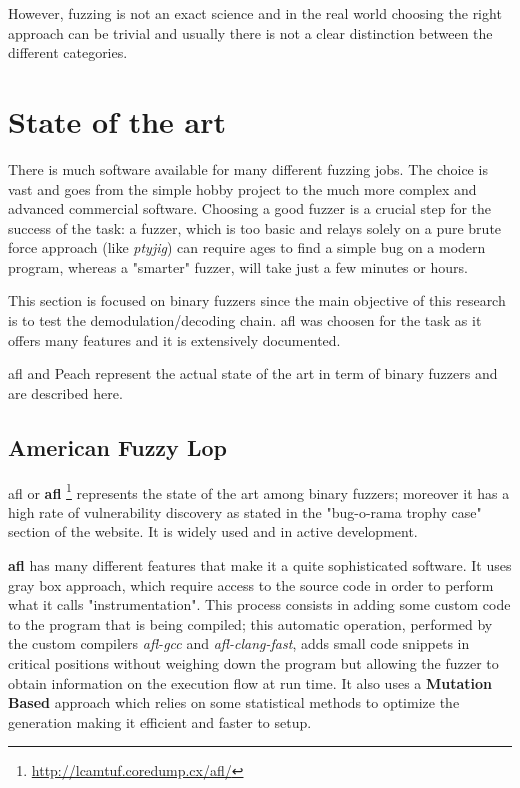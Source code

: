\documentclass[../main.tex]{subfiles}
\begin{document}
However, fuzzing is not an exact science and in the real world choosing the right approach can be trivial and usually there is not a clear distinction between the different categories.


\section{State of the art}

There is much software available for many different fuzzing jobs. The choice is vast and goes from the simple hobby project to the much more complex and advanced commercial software. Choosing a good fuzzer is a crucial step for the success of the task: a fuzzer, which is too basic and relays solely on a pure brute force approach (like \textit{ptyjig}) can require ages to find a simple bug on a modern program, whereas a "smarter" fuzzer, will take just a few minutes or hours.

This section is focused on binary fuzzers since the main objective of this research is to test the demodulation/decoding chain. \acrlong{afl} was choosen for the task as it offers many features and it is extensively documented.

\acrlong{afl} and Peach represent the actual state of the art in term of binary fuzzers and are described here.

\subsection{American Fuzzy Lop}

\acrlong{afl} or \textbf{\acrshort{afl}} \footnote{\url{http://lcamtuf.coredump.cx/afl/}} represents the state of the art among binary fuzzers; moreover it has a high rate of vulnerability discovery as stated in the "bug-o-rama trophy case" section of the website. It is widely used and in active development.

\textbf{\acrshort{afl}} has many different features that make it a quite sophisticated software. It uses gray box approach, which require access to the source code in order to perform what it calls "instrumentation". This process consists in adding some custom code to the program that is being compiled; this automatic operation, performed by the custom compilers \textit{afl-gcc} and \textit{afl-clang-fast}, adds small code snippets in critical positions without weighing down the program but allowing the fuzzer to obtain information on the execution flow at run time. It also uses a \textbf{Mutation Based} approach which relies on  some statistical methods to optimize the generation making it efficient and faster to setup.
\end{document}
